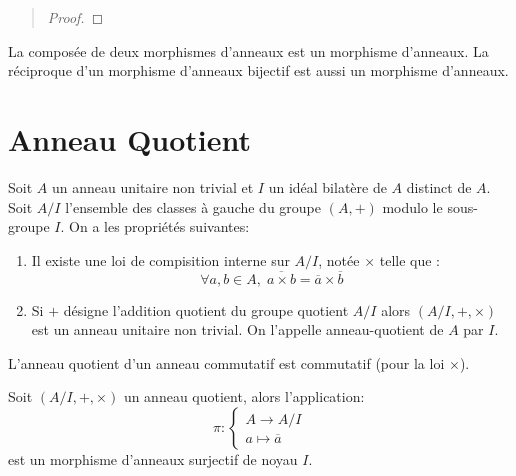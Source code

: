 \begin{quote} 
	\begin{footnotesize} 
		\begin{proof}

			
		\end{proof}
	\end{footnotesize} 
\end{quote} 

\begin{proposition}
		La composée de deux morphismes d'anneaux est un morphisme d'anneaux. La réciproque d'un morphisme d'anneaux bijectif 
		est aussi un morphisme d'anneaux. 
\end{proposition} 


\section{Anneau Quotient}

\begin{theorem}
    Soit $A$ un anneau unitaire non trivial et $I$ un idéal bilatère de $A$ distinct de $A$. 
    Soit $A/I$ l'ensemble des classes à gauche du groupe $(A,+)$ modulo le sous-groupe $I$. 
    On a les propriétés suivantes: 
    \begin{enumerate}[label=\roman*)]
        \item Il existe une loi de compisition interne sur $A/I$, notée $\times$ telle que :
            \[ \forall a,b \in A, \; \overline{a \times b} = \overline{a} \times \overline{b} \] 
        \item Si $+$ désigne l'addition quotient du groupe quotient $A/I$ alors $(A/I, +, \times)$ 
        est un anneau unitaire non trivial. On l'appelle anneau-quotient de $A$ par $I$. 
    \end{enumerate}
\end{theorem}

\begin{proposition}
    L'anneau quotient d'un anneau commutatif est commutatif (pour la loi $\times$). 
\end{proposition}

\begin{proposition}
    Soit $(A/I, +, \times)$ un anneau quotient, alors l'application: 
        \[ \pi : 
            \begin{cases}
                A \longrightarrow A/I \\ 
                a \longmapsto \overline{a}
            \end{cases} \] 
    est un morphisme d'anneaux surjectif de noyau $I$. 
\end{proposition}

